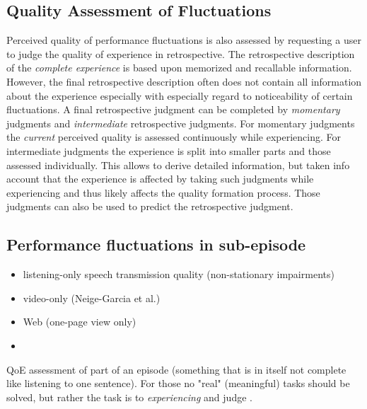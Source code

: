 \subsection{Quality Assessment of Fluctuations}
Perceived quality of performance fluctuations is also assessed by requesting a user to judge the quality of experience in retrospective.
The retrospective description of the \emph{complete experience} is based upon memorized and recallable information.
However, the final retrospective description often does not contain all information about the experience especially with especially regard to noticeability of certain fluctuations.
A final retrospective judgment can be completed by \emph{momentary} judgments and \emph{intermediate} retrospective judgments.
For momentary judgments the \emph{current} perceived quality is assessed continuously while experiencing.
For intermediate judgments the experience is split into smaller parts and those assessed individually.
This allows to derive detailed information, but taken info account that the experience is affected by taking such judgments while experiencing and thus likely affects the quality formation process.
Those judgments can also be used to predict the retrospective judgment.





















\subsection{Performance fluctuations in sub-episode}
\begin{itemize}
\item listening-only speech transmission quality (non-stationary impairments)
\item video-only (Neige-Garcia et al.)
\item Web (one-page view only)
\item \cite{hands_recency_2001}
\end{itemize}

\cite{garcia_parametric_2014}


QoE assessment of part of an episode (something that is in itself not complete like listening to one sentence).
For those no "real" (meaningful) tasks should be solved, but rather the task is to \textit{experiencing} and judge \cite{egger_qoe_2014}.

